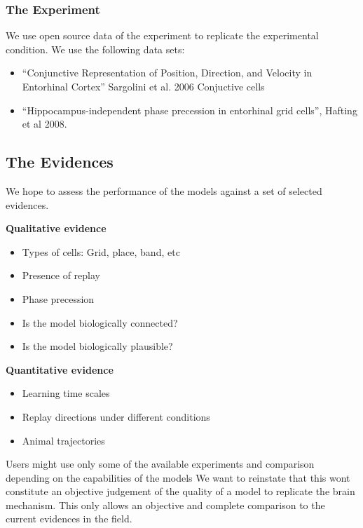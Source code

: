 \documentclass{article}
\begin{document}
\subsubsection{The Experiment}

We use open source data of the experiment to replicate the experimental condition.
We use the following data sets:
\begin{itemize}
    \item  “Conjunctive Representation of Position, Direction, and Velocity in Entorhinal Cortex” Sargolini et al. 2006 Conjuctive cells \cite{sargolini2006conjunctive}

    \item “Hippocampus-independent phase precession in entorhinal grid cells”, Hafting et al 2008.
    \cite{hafting2008hippocampus}
    
\end{itemize}

\subsection{The Evidences}

We hope to assess the performance of the models against a set of selected evidences.

\textbf{Qualitative evidence}
\begin{itemize}
    \item Types of cells: Grid, place, band, etc
\item Presence of replay
\item Phase precession
\item Is the model biologically connected?
\item Is the model biologically plausible?
\end{itemize}

\textbf{Quantitative evidence}
\begin{itemize}
\item Learning time scales
\item Replay directions under different conditions
\item Animal trajectories
\end{itemize}

Users might use only some of the available experiments and comparison depending on the capabilities of the models
We want to reinstate that this wont constitute an objective judgement of the quality of a model to replicate the brain mechanism. This only allows an objective and complete comparison to the current evidences in the field.
\end{document}
